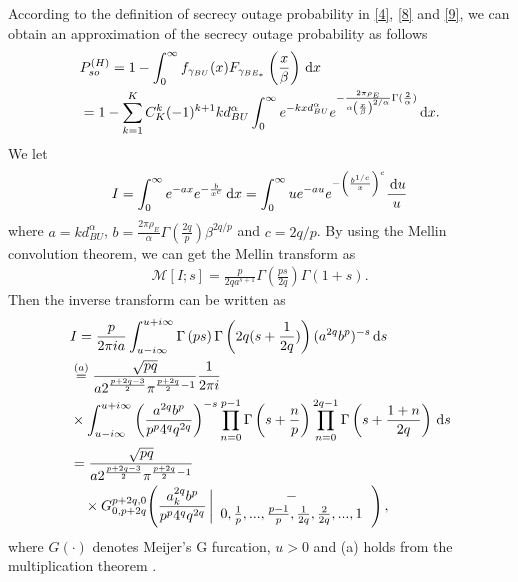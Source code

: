 \documentclass[10pt]{IEEEtran}
\newcommand{\rmd}{\,{\rm d}}
\begin{document}
According to the definition of secrecy outage probability in \eqref{4}, \eqref{8} and \eqref{9}, we can obtain an approximation of the secrecy outage probability as follows
\begin{equation}
\begin{split}
&P^{(H)}_{so} =1- \int_0^\infty f_{\gamma_{BU}}(x)F_{\gamma_{BE_*}}\left(\frac{x}{\beta}\right)\rmd x\\
& =1-\sum_{k=1}^KC^k_K(-1)^{k+1}kd^\alpha_{BU}\int_0^\infty e^{-kxd^\alpha_{BU}}e^{-\frac{2\pi\rho_E}{\alpha\left(\frac{x}{\beta}\right)^{2/\alpha}}\Gamma(\frac{2}{\alpha})}\rmd x.\\
\end{split}
\end{equation}
We let
\begin{equation}
\begin{split}
I = \int_0^\infty e^{-ax}e^{-\frac{b}{x^c}}\rmd x = \int_0^\infty ue^{-au} e^{-\left(\frac{b^{1/c}}{x}\right)^c} \frac{\rmd u}{u}
\end{split}
\end{equation}
where $a = kd^\alpha_{BU}$, $b = \frac{2\pi\rho_E}{\alpha}\Gamma(\frac{2q}{p})\beta^{2q/p}$ and $c = 2q/p$. By using the Mellin convolution theorem, we can get the Mellin transform as
\begin{equation}
\begin{split}
\mathcal{M}[I;s] = \frac{p}{2qa^{s+1}}\Gamma\left(\frac{ps}{2q}\right)\Gamma(1+s).
\end{split}
\end{equation}
Then the inverse transform can be written as
\begin{equation}
\begin{split}
&I = \frac{p}{2\pi ia}\int_{u-i\infty}^{u+i\infty}\Gamma\left(ps\right)\Gamma\left(2q(s+\frac{1}{2q})\right)(a^{2q}b^{p})^{-s}\rmd s\\
& \overset{(a)}{=}\frac{\sqrt{pq}}{a2^{\frac{p+2q-3}{2}}\pi^{\frac{p+2q}{2}-1}}\frac{1}{2\pi i}\\
&\times\int_{u-i\infty}^{u+i\infty}\left( \frac{a^{2q}b^p}{p^p4^qq^{2q}}\right)^{-s}\prod_{n=0}^{p-1}\Gamma\left(s+\frac{n}{p}\right)\prod_{n=0}^{2q-1}\Gamma\left(s+\frac{1+n}{2q}\right)\rmd s\\
& = \frac{\sqrt{pq}}{a2^{\frac{p+2q-3}{2}}\pi^{\frac{p+2q}{2}-1}} \\&~~~\times{G}_{0,p+2q}^{p+2q,0}\!\left(\frac{a_k^{2q}b^p}{p^p4^qq^{2q}}\left|
\begin{array}{c}
  - \\
  0,\frac{1}{p},...,\frac{p-1}{p},\frac{1}{2q},\frac{2}{2q},...,1
\end{array}
\right.
\right),
\end{split}
\end{equation}
where $G(\cdot)$ denotes Meijer's G furcation, $u>0$ and (a) holds from the multiplication theorem \cite{M.A72}.
\end{document}
